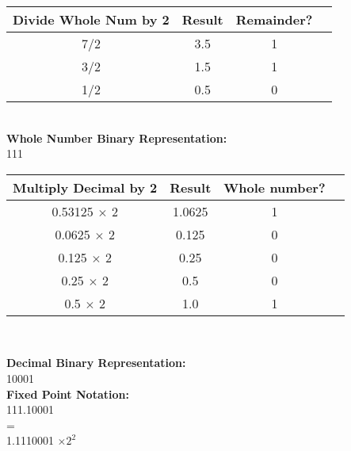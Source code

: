 \documentclass[12pt]{article}
\begin{document}
	
	\begin{center}
		
		\begin{tabular}{ |c|c|c|c| } 
			\hline
			\textbf{Divide Whole Num by 2} & \textbf{Result} & \textbf{Remainder?}  \\
			\hline
			7/2  & 3.5  &  1 \\ 
			\hline
			3/2  & 1.5  &  1 \\ 
			\hline
			1/2  & 0.5  &  0 \\ 
			\hline
		\end{tabular} \vspace{0.4cm} \\
		
		
		
		\textbf{Whole Number Binary Representation:} \\
		111 \vspace{1cm} \\
		
		\begin{tabular}{ |c|c|c|c| } 
			\hline
			\textbf{Multiply Decimal by 2} & \textbf{Result} & \textbf{Whole number?}  \\
			\hline
			0.53125 $\times$ 2  & 1.0625 &  1 \\ 
			\hline
			0.0625  $\times$ 2  & 0.125  &  0 \\
			\hline
			0.125   $\times$ 2  & 0.25   &  0 \\ 
			\hline
			0.25    $\times$ 2  & 0.5    &  0 \\ 
			\hline
			0.5     $\times$ 2  & 1.0    &  1 \\ 
			\hline
		\end{tabular} \vspace{0.6cm} \\
		
		\newpage
		
		
		\textbf{Decimal Binary Representation:} \\
		10001 \vspace{1cm} \\
		
		\textbf{Fixed Point Notation:} \\
		111.10001 \vspace{0.2cm} \\
		
		= \vspace{0.2cm}\\
		
		1.1110001 $\times 2^2$ \vspace{2cm} \\
		
		
	\end{center}
	
\end{document}
